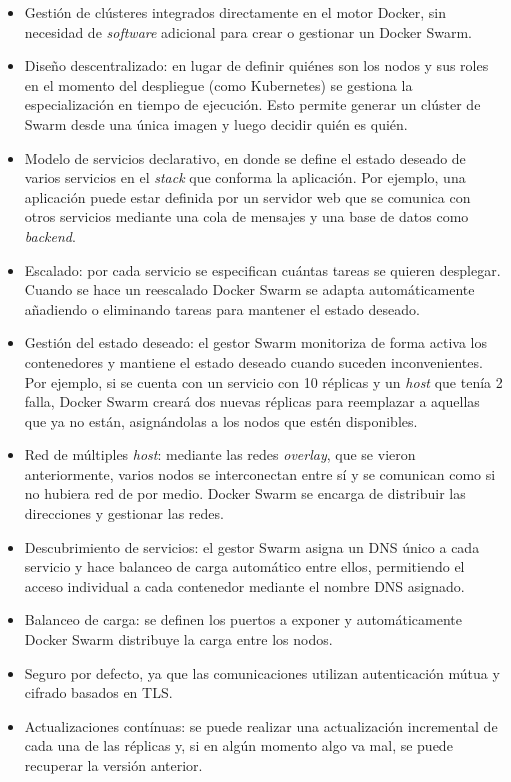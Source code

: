 \begin{itemize}
    \item Gestión de clústeres integrados directamente en el motor Docker, sin 
          necesidad de \textit{software} adicional para crear o gestionar un Docker Swarm.
    \item Diseño descentralizado: en lugar de definir quiénes son los nodos y sus
          roles en el momento del despliegue (como Kubernetes) se gestiona la
          especialización en tiempo de ejecución. Esto permite generar un clúster
          de Swarm desde una única imagen y luego decidir quién es quién.
    \item Modelo de servicios declarativo, en donde se define el estado deseado de
          varios servicios en el \textit{stack} que conforma la aplicación. Por ejemplo,
          una aplicación puede estar definida por un servidor web que se comunica con
          otros servicios mediante una cola de mensajes y una base de datos como
          \textit{backend}.
    \item Escalado: por cada servicio se especifican cuántas tareas se quieren
          desplegar. Cuando se hace un reescalado Docker Swarm se adapta automáticamente
          añadiendo o eliminando tareas para mantener el estado deseado.
    \item Gestión del estado deseado: el gestor Swarm monitoriza de forma activa
          los contenedores y mantiene el estado deseado cuando suceden
          inconvenientes. Por ejemplo, si se cuenta con un servicio con 10 réplicas
          y un \textit{host} que tenía 2 falla, Docker Swarm creará dos nuevas
          réplicas para reemplazar a aquellas que ya no están, asignándolas a los
          nodos que estén disponibles.
    \item Red de múltiples \textit{host}: mediante las redes \textit{overlay}, que
          se vieron anteriormente, varios nodos se interconectan entre sí y
          se comunican como si no hubiera red de por medio. Docker Swarm se encarga
          de distribuir las direcciones y gestionar las redes.
    \item Descubrimiento de servicios: el gestor Swarm asigna un DNS único a cada
          servicio y hace balanceo de carga automático entre ellos, permitiendo
          el acceso individual a cada contenedor mediante el nombre DNS asignado.
    \item Balanceo de carga: se definen los puertos a exponer y automáticamente 
          Docker Swarm distribuye la carga entre los nodos.
    \item Seguro por defecto, ya que las comunicaciones utilizan autenticación
          mútua y cifrado basados en TLS.
    \item Actualizaciones contínuas: se puede realizar una actualización incremental
          de cada una de las réplicas y, si en algún momento algo va mal, se puede
          recuperar la versión anterior.
\end{itemize}

